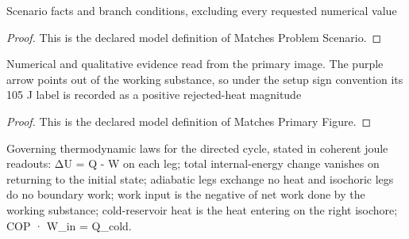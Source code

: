 \begin{definition}
  \label{def:physics:phyx-mini-0423:phyxminiproblems-problemphyxmini0423-matchesproblemscenario}
  Scenario facts and branch conditions, excluding every requested numerical value
\end{definition}
\begin{proof}
  This is the declared model definition of Matches Problem Scenario.
\end{proof}
\begin{definition}
  \label{def:physics:phyx-mini-0423:phyxminiproblems-problemphyxmini0423-matchesprimaryfigure}
  Numerical and qualitative evidence read from the primary image. The purple arrow points out of the working substance, so under the setup sign convention its 105 J label is recorded as a positive rejected-heat magnitude
\end{definition}
\begin{proof}
  This is the declared model definition of Matches Primary Figure.
\end{proof}
\begin{definition}
  \label{def:physics:phyx-mini-0423:phyxminiproblems-problemphyxmini0423-satisfiesrefrigeratorcyclelaws}
  Governing thermodynamic laws for the directed cycle, stated in coherent joule readouts: ΔU = Q - W on each leg; total internal-energy change vanishes on returning to the initial state; adiabatic legs exchange no heat and isochoric legs do no boundary work; work input is the negative of net work done by the working substance; cold-reservoir heat is the heat entering on the right isochore; COP · W\_in = Q\_cold.
\end{definition}
